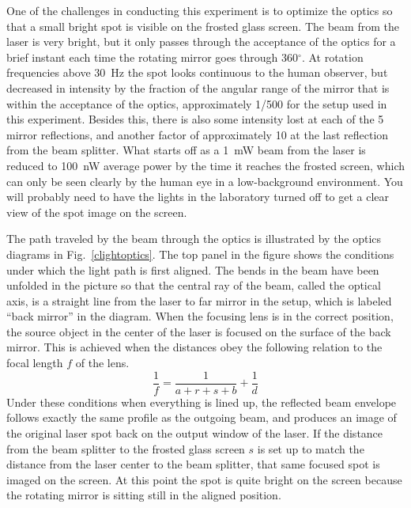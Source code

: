 \documentclass{revtex4}
\begin{document}
One of the challenges in conducting this experiment is to optimize the
optics so that a small bright spot is visible on the frosted glass screen.
The beam from the laser is very bright, but it only passes
through the acceptance of the optics for a brief instant each time the
rotating mirror goes through 360$^{\circ}$.  At rotation frequencies above
30~Hz the spot looks continuous to the human observer, but decreased in
intensity by the fraction of the angular range of the mirror that is within
the acceptance of the optics, approximately 1/500 for the setup used in
this experiment.  Besides this, there is also some intensity lost at each
of the 5 mirror reflections, and another factor of approximately 10 at
the last reflection from the beam splitter.  What starts off as a 1~mW
beam from the laser is reduced to 100~nW average power by the time it
reaches the frosted screen, which can only be seen clearly by the human
eye in a low-background environment.  You will probably need to have the
lights in the laboratory turned off to get a clear view of the spot image
on the screen.

The path traveled by the beam through the optics is illustrated by the
optics diagrams in Fig.~\ref{clightoptics}.  The top panel in the figure
shows the conditions under which the light path is first aligned.  The
bends in the beam have been unfolded in the picture so that the central
ray of the beam, called the optical axis, is a straight line from the
laser to far mirror in the setup, which is labeled ``back mirror'' in the
diagram.  When the focusing lens is in the correct position, the source
object in the center of the laser is focused on the surface of the back
mirror.  This is achieved when the distances obey the following relation
to the focal length $f$ of the lens.
\begin{equation}
\frac{1}{f}=\frac{1}{a+r+s+b}+\frac{1}{d}
\label{eq:focus1}
\end{equation}
Under these conditions when everything is lined up, the reflected
beam envelope follows exactly the same profile as the outgoing beam, and
produces an image of the original laser spot back on the output window
of the laser.  If the distance from the beam splitter to the frosted glass
screen $s$ is set up to match the distance from the laser center to
the beam splitter, that same focused spot is imaged on the screen.  At this
point the spot is quite bright on the screen because the rotating mirror is
sitting still in the aligned position.
\end{document}
